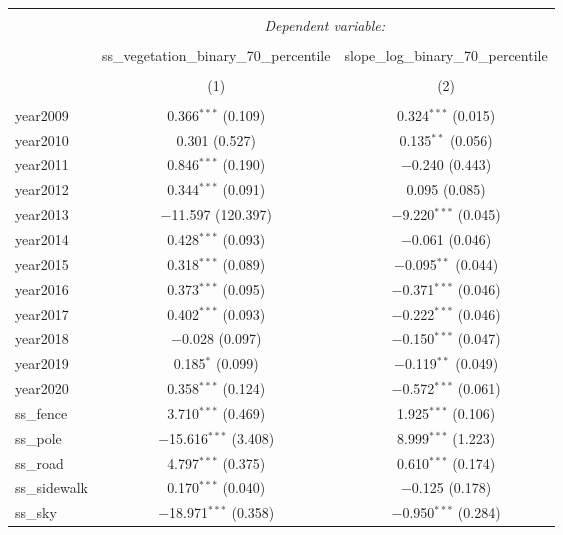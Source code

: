 
\begin{table}[!htbp] \centering 
  \caption{} 
  \label{} 
\small 
\begin{tabular}{@{\extracolsep{1pt}}lcc} 
\\[-1.8ex]\hline 
\hline \\[-1.8ex] 
 & \multicolumn{2}{c}{\textit{Dependent variable:}} \\ 
\cline{2-3} 
\\[-1.8ex] & ss\_vegetation\_binary\_70\_percentile & slope\_log\_binary\_70\_percentile \\ 
\\[-1.8ex] & (1) & (2)\\ 
\hline \\[-1.8ex] 
 year2009 & 0.366$^{***}$ (0.109) & 0.324$^{***}$ (0.015) \\ 
  year2010 & 0.301 (0.527) & 0.135$^{**}$ (0.056) \\ 
  year2011 & 0.846$^{***}$ (0.190) & $-$0.240 (0.443) \\ 
  year2012 & 0.344$^{***}$ (0.091) & 0.095 (0.085) \\ 
  year2013 & $-$11.597 (120.397) & $-$9.220$^{***}$ (0.045) \\ 
  year2014 & 0.428$^{***}$ (0.093) & $-$0.061 (0.046) \\ 
  year2015 & 0.318$^{***}$ (0.089) & $-$0.095$^{**}$ (0.044) \\ 
  year2016 & 0.373$^{***}$ (0.095) & $-$0.371$^{***}$ (0.046) \\ 
  year2017 & 0.402$^{***}$ (0.093) & $-$0.222$^{***}$ (0.046) \\ 
  year2018 & $-$0.028 (0.097) & $-$0.150$^{***}$ (0.047) \\ 
  year2019 & 0.185$^{*}$ (0.099) & $-$0.119$^{**}$ (0.049) \\ 
  year2020 & 0.358$^{***}$ (0.124) & $-$0.572$^{***}$ (0.061) \\ 
  ss\_fence & 3.710$^{***}$ (0.469) & 1.925$^{***}$ (0.106) \\ 
  ss\_pole & $-$15.616$^{***}$ (3.408) & 8.999$^{***}$ (1.223) \\ 
  ss\_road & 4.797$^{***}$ (0.375) & 0.610$^{***}$ (0.174) \\ 
  ss\_sidewalk & 0.170$^{***}$ (0.040) & $-$0.125 (0.178) \\ 
  ss\_sky & $-$18.971$^{***}$ (0.358) & $-$0.950$^{***}$ (0.284) \\ 

\end{tabular}
\end{table}
